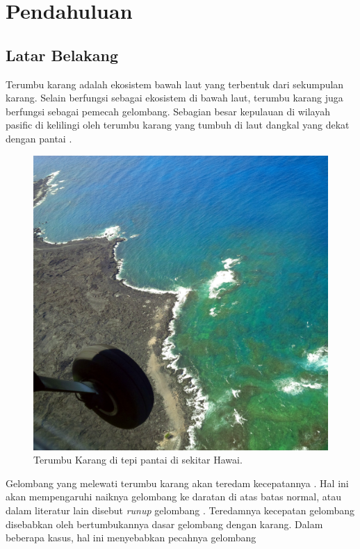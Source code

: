 \chapter{Pendahuluan}
\section{Latar Belakang}

Terumbu karang adalah ekosistem bawah laut yang terbentuk dari sekumpulan karang. Selain berfungsi sebagai ekosistem di bawah laut, terumbu karang juga berfungsi sebagai pemecah gelombang. Sebagian besar kepulauan di wilayah pasific di kelilingi oleh terumbu karang yang tumbuh di laut dangkal yang dekat dengan pantai \cite{DemirbilekBoussinesq}.

\begin{figure}[htp]
    \begin{center}
        \includegraphics[scale=0.1]{./images/hawai_coral.jpg}
    \end{center}
    \caption{Terumbu Karang di tepi pantai di sekitar Hawai.}
\end{figure}

Gelombang yang melewati terumbu karang akan teredam kecepatannya \cite{DemirbilekReport}. Hal ini akan mempengaruhi naiknya gelombang ke daratan di atas batas normal, atau dalam literatur lain disebut \emph{runup} gelombang \cite{nielsen1991wave}. Teredamnya kecepatan gelombang disebabkan oleh bertumbukannya dasar gelombang dengan karang. Dalam beberapa kasus, hal ini menyebabkan pecahnya gelombang \cite{DemirbilekReport}

